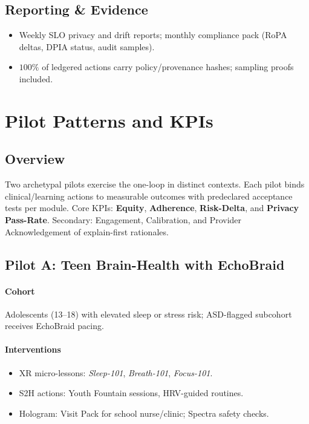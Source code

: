 \documentclass[11pt]{article}
\theoremstyle{plain}
\begin{document}
\subsection{Reporting \& Evidence}
\begin{itemize}
  \item Weekly SLO privacy and drift reports; monthly compliance pack (RoPA deltas, DPIA status, audit samples).
  \item $100\%$ of ledgered actions carry policy/provenance hashes; sampling proofs included.
\end{itemize}



\section{Pilot Patterns and KPIs}

\subsection{Overview}
Two archetypal pilots exercise the one-loop in distinct contexts. Each pilot binds clinical/learning actions to measurable outcomes with predeclared acceptance tests per module. Core KPIs: \textbf{Equity}, \textbf{Adherence}, \textbf{Risk-Delta}, and \textbf{Privacy Pass-Rate}. Secondary: Engagement, Calibration, and Provider Acknowledgement of explain-first rationales.

\subsection{Pilot A: Teen Brain-Health with EchoBraid}
\paragraph{Cohort}
Adolescents (13--18) with elevated sleep or stress risk; ASD-flagged subcohort receives EchoBraid pacing.
\paragraph{Interventions}
\begin{itemize}
  \item XR micro-lessons: \emph{Sleep-101}, \emph{Breath-101}, \emph{Focus-101}.
  \item S2H actions: Youth Fountain sessions, HRV-guided routines.
  \item Hologram: Visit Pack for school nurse/clinic; Spectra safety checks.
\end{itemize}
\end{document}

